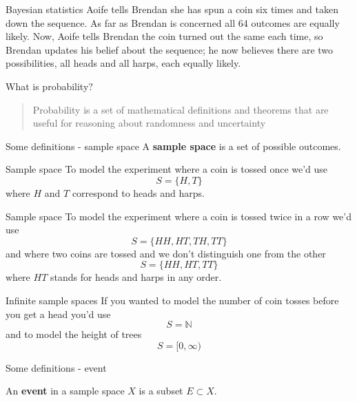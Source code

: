 \documentclass{beamer}
\newcommand{\crish}{\color{reddish}}
\newcommand{\cbla}{\color{black}}
\newcommand{\cred}{\color{red}}
\newcommand{\cblu}{\color{blue}}
\begin{document}
\begin{frame}{Bayesian statistics}
  \cred{}Aoife\cbla{}  tells \cblu{}Brendan\cbla{}  she has spun a coin six times and taken down the
  sequence. As far as \cblu{}Brendan\cbla{}  is concerned all 64 outcomes are equally
  likely. Now, \cred{}Aoife\cbla{}  tells \cblu{}Brendan\cbla{}  the coin turned out the same each
  time, so \cblu{}Brendan\cbla{}  updates his belief about the sequence; he now
  believes there are two possibilities, all heads and all harps, each
  equally likely.
\end{frame}

\begin{frame}{What is probability?}
  \begin{quote}
    Probability is a set of mathematical definitions and theorems that
    are useful for reasoning about randomness and uncertainty
  \end{quote}
\end{frame}

\begin{frame}{Some definitions - sample space}
  A \textbf{sample space} is a set of possible outcomes. 
\end{frame}

\begin{frame}{Sample space}
  To model the experiment where a coin is tossed once we'd use
  \crish$$S=\{H,T\}$$\cbla{}
  where \crish$H$\cbla{} and \crish$T$\cbla{} correspond to heads and harps.
\end{frame}


\begin{frame}{Sample space}
  To model the experiment where a coin is tossed twice in a row we'd use
  \crish$$S=\{HH,HT,TH,TT\}$$\cbla{}
  and where two coins are tossed and we don't distinguish one from the other
  \crish$$S=\{HH,HT,TT\}$$\cbla{}
  where \crish$HT$\cbla{} stands for heads and harps in any order.
\end{frame}

\begin{frame}{Infinite sample spaces}
  If you wanted to model the number of coin tosses before you get a head you'd use
  \crish$$S=\mathbb{N}$$\cbla{}
  and to model the height of trees
  \crish$$S=[0,\infty)$$\cbla{}
\end{frame}

\begin{frame}{Some definitions - event}

  An \textbf{event} in a sample space \crish$X$\cbla{} is a subset \crish$E\subset X$\cbla{}.

\end{frame}
\end{document}
